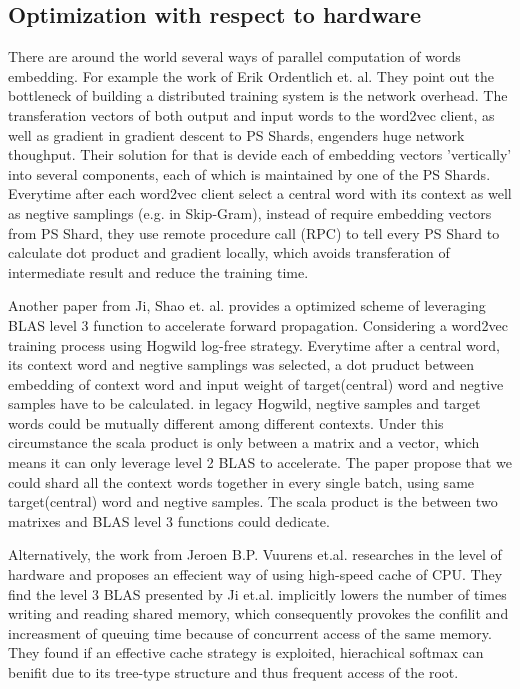 \documentclass[11pt]{article}
\begin{document}
\subsection{Optimization with respect to hardware}
There are around the world several ways of parallel computation of words embedding. For example the work of Erik Ordentlich et. al\cite{ordentlich2016network}. They point out the bottleneck of building a distributed training system is the network overhead. The transferation vectors of both output and input words to the word2vec client, as well as gradient in gradient descent to PS Shards, engenders huge network thoughput. Their solution for that is devide each of embedding vectors 'vertically' into several components, each of which is maintained by one of the PS Shards. Everytime after each word2vec client select a central word with its context as well as negtive samplings (e.g. in Skip-Gram), instead of require embedding vectors from PS Shard, they use remote procedure call (RPC) to tell every PS Shard to calculate dot product and gradient locally, which avoids transferation of intermediate result and reduce the training time.

Another paper from Ji, Shao et. al.\cite{ji2016parallelizing} provides a optimized scheme of leveraging BLAS level 3 function to accelerate forward propagation. Considering a word2vec training process using Hogwild\cite{recht2011hogwild} log-free strategy. Everytime after a central word, its context word and negtive samplings was selected, a dot pruduct between embedding of context word and input weight of target(central) word and negtive samples have to be calculated. in legacy Hogwild, negtive samples and target words could be mutually different among different contexts. Under this circumstance the scala product is only between a matrix and a vector, which means it can only leverage level 2 BLAS to accelerate. The paper propose that we could shard all the context words together in every single batch, using same target(central) word and negtive samples. The scala product is the between two matrixes and BLAS level 3 functions could dedicate.

Alternatively, the work from Jeroen B.P. Vuurens et.al.\cite{eickhoff2016efficient} researches in the level of hardware and proposes an effecient way of using high-speed cache of CPU. They find the level 3 BLAS presented by Ji et.al. implicitly lowers the number of times writing and reading shared memory, which consequently provokes the confilit and increasment of queuing time because of concurrent access of the same memory. They found if an effective cache strategy is exploited, hierachical softmax can benifit due to its tree-type structure and  thus frequent access of the root.
\end{document}
